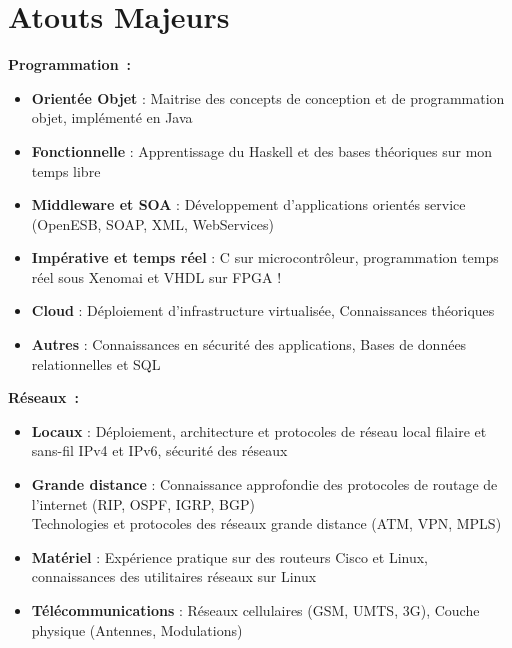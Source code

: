 \documentclass[]{friggeri-cv} %
\begin{document}
\vspace{-0.2cm}

\section{Atouts Majeurs}


\textbf{\large Programmation~:}
\vspace{-0.1cm}
\begin{itemize}[noitemsep,nolistsep]
\item \textbf{Orientée Objet} : Maitrise des concepts de conception et de programmation objet, implémenté en Java
\item \textbf{Fonctionnelle} : Apprentissage du Haskell et des bases théoriques sur mon temps libre
\item \textbf{Middleware et SOA} : Développement d'applications orientés service (OpenESB, SOAP, XML, WebServices)
\item \textbf{Impérative et temps réel} : C sur microcontrôleur, programmation temps réel sous Xenomai 
et VHDL sur FPGA
!%
\item \textbf{Cloud} : Déploiement d'infrastructure virtualisée, Connaissances théoriques
\item \textbf{Autres} : Connaissances en sécurité des applications, Bases de données relationnelles et SQL
\end{itemize}

\textbf{\large Réseaux~:} 
\vspace{-0.1cm}
\begin{itemize}[noitemsep,nolistsep]
\item \textbf{Locaux} : Déploiement, architecture et protocoles de réseau local filaire et sans-fil IPv4 et IPv6, sécurité des réseaux
\item \textbf{Grande distance} : Connaissance approfondie des protocoles de routage de l'internet (RIP, OSPF, IGRP, BGP)\\
Technologies et protocoles des réseaux grande distance (ATM, VPN, MPLS)
\item \textbf{Matériel} : Expérience pratique sur des routeurs Cisco et Linux, connaissances des utilitaires réseaux sur Linux
\item \textbf{Télécommunications} : Réseaux cellulaires (GSM, UMTS, 3G), Couche physique (Antennes, Modulations)
\end{itemize}
\end{document}
